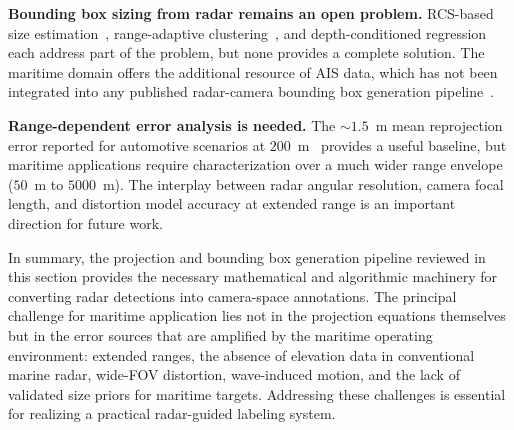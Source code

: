 \textbf{Bounding box sizing from radar remains an open problem.} RCS-based size estimation~\cite{wang2021rodnet}, range-adaptive clustering~\cite{schumann2020radarnet}, and depth-conditioned regression~\cite{singh2023depth} each address part of the problem, but none provides a complete solution. The maritime domain offers the additional resource of AIS data, which has not been integrated into any published radar-camera bounding box generation pipeline~\cite{xu2024maritime}.

\textbf{Range-dependent error analysis is needed.} The ${\sim}1.5$~m mean reprojection error reported for automotive scenarios at $200$~m~\cite{sengupta2024comprehensive} provides a useful baseline, but maritime applications require characterization over a much wider range envelope ($50$~m to $5000$~m). The interplay between radar angular resolution, camera focal length, and distortion model accuracy at extended range is an important direction for future work.

In summary, the projection and bounding box generation pipeline reviewed in this section provides the necessary mathematical and algorithmic machinery for converting radar detections into camera-space annotations. The principal challenge for maritime application lies not in the projection equations themselves but in the error sources that are amplified by the maritime operating environment: extended ranges, the absence of elevation data in conventional marine radar, wide-FOV distortion, wave-induced motion, and the lack of validated size priors for maritime targets. Addressing these challenges is essential for realizing a practical radar-guided labeling system.
